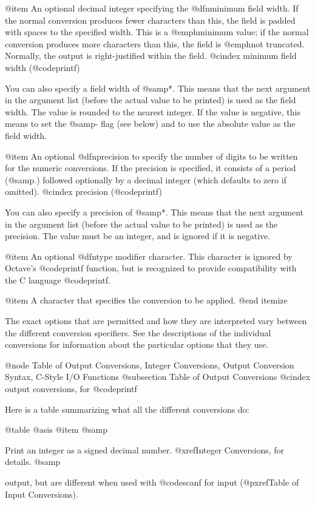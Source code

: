 {{{{{{{{{{{{{{@item 
An optional decimal integer specifying the @dfn{minimum field width}.
If the normal conversion produces fewer characters than this, the field
is padded with spaces to the specified width.  This is a @emph{minimum}
value; if the normal conversion produces more characters than this, the
field is @emph{not} truncated.  Normally, the output is right-justified
within the field.
@cindex minimum field width (@code{printf})

You can also specify a field width of @samp{*}.  This means that the
next argument in the argument list (before the actual value to be
printed) is used as the field width.  The value is rounded to the
nearest integer.  If the value is negative, this means to set the
@samp{-} flag (see below) and to use the absolute value as the field
width.

@item 
An optional @dfn{precision} to specify the number of digits to be
written for the numeric conversions.  If the precision is specified, it
consists of a period (@samp{.}) followed optionally by a decimal integer
(which defaults to zero if omitted).
@cindex precision (@code{printf})

You can also specify a precision of @samp{*}.  This means that the next
argument in the argument list (before the actual value to be printed) is
used as the precision.  The value must be an integer, and is ignored
if it is negative.

@item
An optional @dfn{type modifier character}.  This character is ignored by
Octave's @code{printf} function, but is recognized to provide
compatibility with the C language @code{printf}.

@item
A character that specifies the conversion to be applied.
@end itemize

The exact options that are permitted and how they are interpreted vary 
between the different conversion specifiers.  See the descriptions of the
individual conversions for information about the particular options that
they use.

@node Table of Output Conversions, Integer Conversions, Output Conversion Syntax, C-Style I/O Functions
@subsection Table of Output Conversions
@cindex output conversions, for @code{printf}

Here is a table summarizing what all the different conversions do:

@table @asis
@item @samp{%
Print an integer as a signed decimal number.  @xref{Integer
Conversions}, for details.  @samp{%
output, but are different when used with @code{scanf} for input
(@pxref{Table of Input Conversions}).

}}}}}}}}}}}}}}}}

